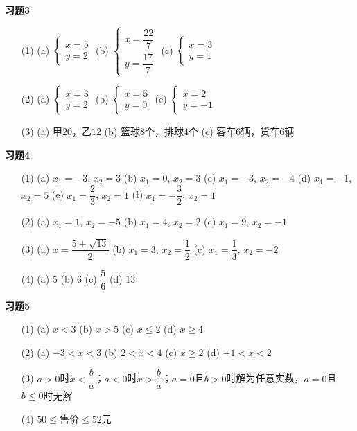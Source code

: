 \documentclass[a4paper,12pt]{ctexart}
\begin{document}
\textbf{习题3}
\begin{enumerate}
\item[(1)] (a) $\begin{cases}x=5\\ y=2\end{cases}$ \qquad (b) $\begin{cases}x=\dfrac{22}{7}\\ y=\dfrac{17}{7}\end{cases}$ \qquad (c) $\begin{cases}x=3\\ y=1\end{cases}$
\item[(2)] (a) $\begin{cases}x=3\\ y=2\end{cases}$ \qquad (b) $\begin{cases}x=5\\ y=0\end{cases}$ \qquad (c) $\begin{cases}x=2\\ y=-1\end{cases}$
\item[(3)] (a) 甲$20$，乙$12$ \qquad (b) 篮球$8$个，排球$4$个 \qquad (c) 客车$6$辆，货车$6$辆
\end{enumerate}

\textbf{习题4}
\begin{enumerate}
\item[(1)] (a) $x_1=-3$, $x_2=3$ \qquad (b) $x_1=0$, $x_2=3$ \qquad (c) $x_1=-3$, $x_2=-4$ \qquad (d) $x_1=-1$, $x_2=5$ \qquad (e) $x_1=\dfrac23$, $x_2=1$ \qquad (f) $x_1=-\dfrac32$, $x_2=1$
\item[(2)] (a) $x_1=1$, $x_2=-5$ \qquad (b) $x_1=4$, $x_2=2$ \qquad (c) $x_1=9$, $x_2=-1$
\item[(3)] (a) $x=\dfrac{5\pm\sqrt{13}}{2}$ \qquad (b) $x_1=3$, $x_2=\dfrac12$ \qquad (c) $x_1=\dfrac13$, $x_2=-2$
\item[(4)] (a) $5$ \qquad (b) $6$ \qquad (c) $\dfrac56$ \qquad (d) $13$
\end{enumerate}

\textbf{习题5}
\begin{enumerate}
\item[(1)] (a) $x<3$ \qquad (b) $x>5$ \qquad (c) $x\le2$ \qquad (d) $x\ge4$
\item[(2)] (a) $-3<x<3$ \qquad (b) $2<x<4$ \qquad (c) $x\ge2$ \qquad (d) $-1<x<2$
\item[(3)] $a>0$时$x<\dfrac ba$；$a<0$时$x>\dfrac ba$；$a=0$且$b>0$时解为任意实数，$a=0$且$b\le0$时无解
\item[(4)] $50\le\text{售价}\le52$元
\end{enumerate}
\end{document}
